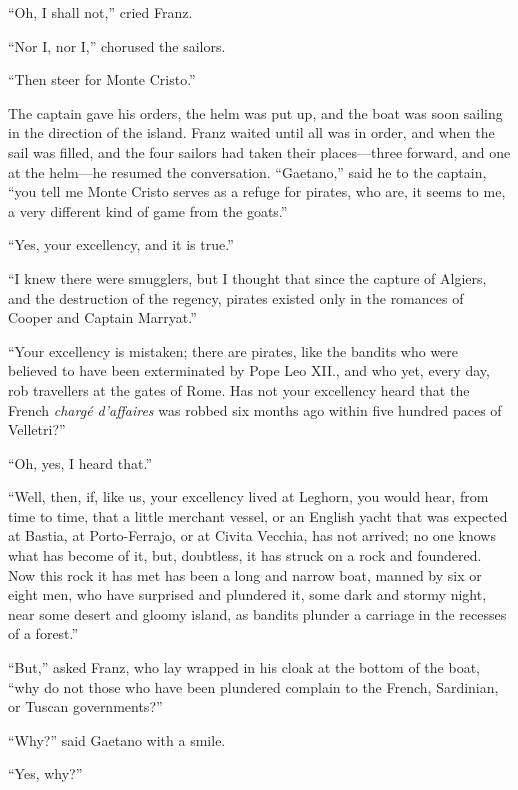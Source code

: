 “Oh, I shall not,” cried Franz.

“Nor I, nor I,” chorused the sailors.

“Then steer for Monte Cristo.”

The captain gave his orders, the helm was put up, and the boat was soon
sailing in the direction of the island. Franz waited until all was in
order, and when the sail was filled, and the four sailors had taken
their places—three forward, and one at the helm—he resumed the
conversation. “Gaetano,” said he to the captain, “you tell me Monte
Cristo serves as a refuge for pirates, who are, it seems to me, a very
different kind of game from the goats.”

“Yes, your excellency, and it is true.”

“I knew there were smugglers, but I thought that since the capture of
Algiers, and the destruction of the regency, pirates existed only in
the romances of Cooper and Captain Marryat.”

“Your excellency is mistaken; there are pirates, like the bandits who
were believed to have been exterminated by Pope Leo XII., and who yet,
every day, rob travellers at the gates of Rome. Has not your excellency
heard that the French \textit{chargé d’affaires} was robbed six months ago
within five hundred paces of Velletri?”

“Oh, yes, I heard that.”

“Well, then, if, like us, your excellency lived at Leghorn, you would
hear, from time to time, that a little merchant vessel, or an English
yacht that was expected at Bastia, at Porto-Ferrajo, or at Civita
Vecchia, has not arrived; no one knows what has become of it, but,
doubtless, it has struck on a rock and foundered. Now this rock it has
met has been a long and narrow boat, manned by six or eight men, who
have surprised and plundered it, some dark and stormy night, near some
desert and gloomy island, as bandits plunder a carriage in the recesses
of a forest.”

“But,” asked Franz, who lay wrapped in his cloak at the bottom of the
boat, “why do not those who have been plundered complain to the French,
Sardinian, or Tuscan governments?”

“Why?” said Gaetano with a smile.

“Yes, why?”

